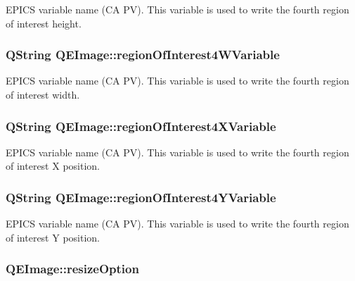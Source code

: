\label{classQEImage_a26954e75f3b5dfca80be2a3db7d61e1c}
EPICS variable name (CA PV). This variable is used to write the fourth region of interest height. \hypertarget{classQEImage_af351ddd82e7c4041784b7cce52ab8794}{
\subsubsection[{regionOfInterest4WVariable}]{\setlength{\rightskip}{0pt plus 5cm}QString QEImage::regionOfInterest4WVariable}}
\label{classQEImage_af351ddd82e7c4041784b7cce52ab8794}
EPICS variable name (CA PV). This variable is used to write the fourth region of interest width. \hypertarget{classQEImage_a9d5b3ec22cd90b502473c9d58f12229d}{
\subsubsection[{regionOfInterest4XVariable}]{\setlength{\rightskip}{0pt plus 5cm}QString QEImage::regionOfInterest4XVariable}}
\label{classQEImage_a9d5b3ec22cd90b502473c9d58f12229d}
EPICS variable name (CA PV). This variable is used to write the fourth region of interest X position. \hypertarget{classQEImage_aeef143dd5978a2a973e285d12d8c3367}{
\subsubsection[{regionOfInterest4YVariable}]{\setlength{\rightskip}{0pt plus 5cm}QString QEImage::regionOfInterest4YVariable}}
\label{classQEImage_aeef143dd5978a2a973e285d12d8c3367}
EPICS variable name (CA PV). This variable is used to write the fourth region of interest Y position. \hypertarget{classQEImage_a04b44c02ff4adaf1d2980af059a91610}{
\subsubsection[{resizeOption}]{ QEImage::resizeOption}}
